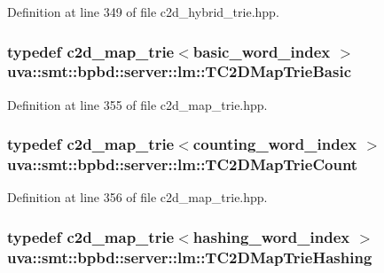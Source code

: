 Definition at line 349 of file c2d\+\_\+hybrid\+\_\+trie.\+hpp.

\hypertarget{namespaceuva_1_1smt_1_1bpbd_1_1server_1_1lm_a75d788d13013f404f0c4527c0e737931}{}
\subsubsection[{T\+C2\+D\+Map\+Trie\+Basic}]{\setlength{\rightskip}{0pt plus 5cm}typedef {\bf c2d\+\_\+map\+\_\+trie}$<${\bf basic\+\_\+word\+\_\+index} $>$ {\bf uva\+::smt\+::bpbd\+::server\+::lm\+::\+T\+C2\+D\+Map\+Trie\+Basic}}\label{namespaceuva_1_1smt_1_1bpbd_1_1server_1_1lm_a75d788d13013f404f0c4527c0e737931}


Definition at line 355 of file c2d\+\_\+map\+\_\+trie.\+hpp.

\hypertarget{namespaceuva_1_1smt_1_1bpbd_1_1server_1_1lm_ae3cabc935d941692c21b332a2c187907}{}
\subsubsection[{T\+C2\+D\+Map\+Trie\+Count}]{\setlength{\rightskip}{0pt plus 5cm}typedef {\bf c2d\+\_\+map\+\_\+trie}$<${\bf counting\+\_\+word\+\_\+index} $>$ {\bf uva\+::smt\+::bpbd\+::server\+::lm\+::\+T\+C2\+D\+Map\+Trie\+Count}}\label{namespaceuva_1_1smt_1_1bpbd_1_1server_1_1lm_ae3cabc935d941692c21b332a2c187907}


Definition at line 356 of file c2d\+\_\+map\+\_\+trie.\+hpp.

\hypertarget{namespaceuva_1_1smt_1_1bpbd_1_1server_1_1lm_a506e03c5deb4996143f74b16273abafb}{}
\subsubsection[{T\+C2\+D\+Map\+Trie\+Hashing}]{\setlength{\rightskip}{0pt plus 5cm}typedef {\bf c2d\+\_\+map\+\_\+trie}$<${\bf hashing\+\_\+word\+\_\+index} $>$ {\bf uva\+::smt\+::bpbd\+::server\+::lm\+::\+T\+C2\+D\+Map\+Trie\+Hashing}}\label{namespaceuva_1_1smt_1_1bpbd_1_1server_1_1lm_a506e03c5deb4996143f74b16273abafb}


